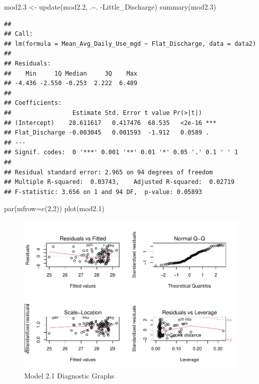 \documentclass[
  12pt,
]{article}
\newenvironment{Shaded}{\begin{snugshade}}{\end{snugshade}}
\newcommand{\AttributeTok}[1]{\textcolor[rgb]{0.77,0.63,0.00}{#1}}
\newcommand{\DecValTok}[1]{\textcolor[rgb]{0.00,0.00,0.81}{#1}}
\newcommand{\FloatTok}[1]{\textcolor[rgb]{0.00,0.00,0.81}{#1}}
\newcommand{\FunctionTok}[1]{\textcolor[rgb]{0.00,0.00,0.00}{#1}}
\newcommand{\NormalTok}[1]{#1}
\newcommand{\OtherTok}[1]{\textcolor[rgb]{0.56,0.35,0.01}{#1}}
\newcommand{\SpecialCharTok}[1]{\textcolor[rgb]{0.00,0.00,0.00}{#1}}
\begin{document}
\begin{Shaded}
\begin{Highlighting}[]
\NormalTok{mod2}\FloatTok{.3} \OtherTok{\textless{}{-}} \FunctionTok{update}\NormalTok{(mod2}\FloatTok{.2}\NormalTok{, .}\SpecialCharTok{\textasciitilde{}}\NormalTok{. }\SpecialCharTok{{-}}\NormalTok{Little\_Discharge)}
\FunctionTok{summary}\NormalTok{(mod2}\FloatTok{.3}\NormalTok{)}
\end{Highlighting}
\end{Shaded}

\begin{verbatim}
## 
## Call:
## lm(formula = Mean_Avg_Daily_Use_mgd ~ Flat_Discharge, data = data2)
## 
## Residuals:
##    Min     1Q Median     3Q    Max 
## -4.436 -2.550 -0.253  2.222  6.489 
## 
## Coefficients:
##                 Estimate Std. Error t value Pr(>|t|)    
## (Intercept)    28.611617   0.417476  68.535   <2e-16 ***
## Flat_Discharge -0.003045   0.001593  -1.912   0.0589 .  
## ---
## Signif. codes:  0 '***' 0.001 '**' 0.01 '*' 0.05 '.' 0.1 ' ' 1
## 
## Residual standard error: 2.965 on 94 degrees of freedom
## Multiple R-squared:  0.03743,    Adjusted R-squared:  0.02719 
## F-statistic: 3.656 on 1 and 94 DF,  p-value: 0.05893
\end{verbatim}

\begin{Shaded}
\begin{Highlighting}[]
\FunctionTok{par}\NormalTok{(}\AttributeTok{mfrow=}\FunctionTok{c}\NormalTok{(}\DecValTok{2}\NormalTok{,}\DecValTok{2}\NormalTok{))}
\FunctionTok{plot}\NormalTok{(mod2}\FloatTok{.1}\NormalTok{)}
\end{Highlighting}
\end{Shaded}

\begin{figure}
\centering
\includegraphics{Project_files/figure-latex/river discharge and withdraws,-1.pdf}
\caption{Model 2.1 Diagnostic Graphs}
\end{figure}
\end{document}
